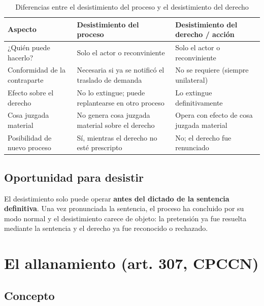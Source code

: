 \documentclass[12pt,oneside]{book}
\begin{document}
\begin{table}[H]
\centering
\begin{tabularx}{\textwidth}{
    >{\raggedright\arraybackslash}p{}
    >{\raggedright\arraybackslash}X
    >{\raggedright\arraybackslash}X
}
\toprule
\textbf{Aspecto} & \textbf{Desistimiento del proceso} & \textbf{Desistimiento del derecho / acción} \\
\midrule
¿Quién puede hacerlo? & Solo el actor o reconviniente & Solo el actor o reconviniente \\
\addlinespace
Conformidad de la contraparte & Necesaria si ya se notificó el traslado de demanda & No se requiere (siempre unilateral) \\
\addlinespace
Efecto sobre el derecho & No lo extingue; puede replantearse en otro proceso & Lo extingue definitivamente \\
\addlinespace
Cosa juzgada material & No genera cosa juzgada material sobre el derecho & Opera con efecto de cosa juzgada material \\
\addlinespace
Posibilidad de nuevo proceso & Sí, mientras el derecho no esté prescripto & No; el derecho fue renunciado \\
\bottomrule
\end{tabularx}
\caption{Diferencias entre el desistimiento del proceso y el desistimiento del derecho}
\end{table}

\section{Oportunidad para desistir}

El desistimiento solo puede operar \textbf{antes del dictado de la sentencia definitiva}. Una vez pronunciada la sentencia, el proceso ha concluido por su modo normal y el desistimiento carece de objeto: la pretensión ya fue resuelta mediante la sentencia y el derecho ya fue reconocido o rechazado.

\chapter{El allanamiento (art. 307, CPCCN)}

\section{Concepto}
\end{document}
